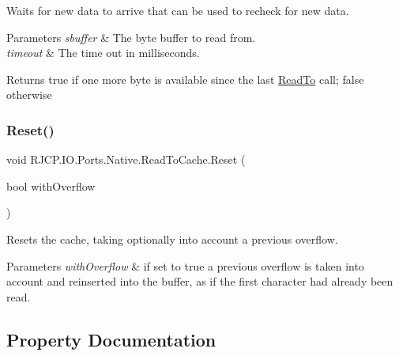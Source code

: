 Waits for new data to arrive that can be used to recheck for new data. 


\begin{DoxyParams}{Parameters}
{\em sbuffer} & The byte buffer to read from.\\
\hline
{\em timeout} & The time out in milliseconds.\\
\hline
\end{DoxyParams}
\begin{DoxyReturn}{Returns}
{\ttfamily true} if one more byte is available since the last \mbox{\hyperlink{class_r_j_c_p_1_1_i_o_1_1_ports_1_1_native_1_1_read_to_cache_a57a77a7d1da2574cb05400c5745613c2}{Read\+To}} call; {\ttfamily false} otherwise
\end{DoxyReturn}
\mbox{\label{class_r_j_c_p_1_1_i_o_1_1_ports_1_1_native_1_1_read_to_cache_ada7cbbcfb8b96ab3d096ac034eb0c94b}} 
\subsubsection{\texorpdfstring{Reset()}{Reset()}}
{\footnotesize\ttfamily void R\+J\+C\+P.\+I\+O.\+Ports.\+Native.\+Read\+To\+Cache.\+Reset (\begin{DoxyParamCaption}\item[{bool}]{with\+Overflow }\end{DoxyParamCaption})}



Resets the cache, taking optionally into account a previous overflow. 


\begin{DoxyParams}{Parameters}
{\em with\+Overflow} & if set to {\ttfamily true} a previous overflow is taken into account and reinserted into the buffer, as if the first character had already been read.\\
\hline
\end{DoxyParams}


\subsection{Property Documentation}
\mbox{\label{class_r_j_c_p_1_1_i_o_1_1_ports_1_1_native_1_1_read_to_cache_a4ddb8704e3d3d39b40bba23183885700}} 
